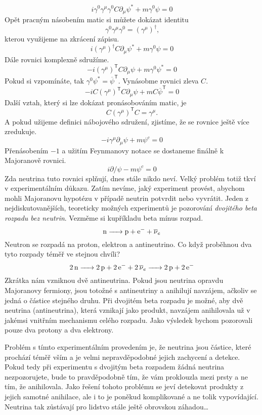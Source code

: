 \documentclass{../../../../style/mkimain}
\begin{document}
\begin{enumerate}
$$i\gamma^0\gamma^\mu\gamma^0C\partial_\mu \psi^*+m\gamma^0\psi=0$$
Opět pracným násobením matic si můžete dokázat identitu
$$\gamma^0\gamma^\mu\gamma^0=\left(\gamma^\mu\right)^\dagger \text{,}$$
kterou využijeme na zkrácení zápisu.
$$i\left(\gamma^\mu\right)^\dagger C\partial_\mu \psi^*+m\gamma^0\psi=0$$
Dále rovnici komplexně sdružíme.
$$-i\left(\gamma^\mu\right)^\mathsf{T} C\partial_\mu \psi+m\gamma^0\psi^*=0$$
Pokud si vzpomínáte, tak $\gamma^0\psi^*=\overline{\psi}^\mathsf{T}$. Vynásobme rovnici zleva $C$.
$$-iC\left(\gamma^\mu\right)^\mathsf{T} C \partial_\mu \psi+mC\overline{\psi}^\mathsf{T}=0$$
Další vztah, který si lze dokázat pronásobováním matic, je
$$C\left(\gamma^\mu\right)^\mathsf{T} C=\gamma^\mu\text{.}$$
A pokud užijeme definici nábojového sdružení, zjistíme, že se rovnice ještě více zredukuje.
$$-i\gamma^\mu\partial_\mu \psi+m\psi^c=0$$
Přenásobením $-1$ a užitím Feynmanovy  notace se dostaneme finálně k Majoranově rovnici.
$$i\partial\!\!\!/\psi-m\psi^c=0$$
Zda neutrina tuto rovnici splňují, dnes stále nikdo neví. Velký problém totiž tkví v experimentálním důkazu. Zatím nevíme, jaký experiment provést, abychom mohli Majoranovu hypotézu v případě neutrin potvrdit nebo vyvrátit. Jeden z nejdiskutovanějších, teoreticky možných experimentů je pozorování \emph{dvojitého beta rozpadu bez neutrin}.
Vezměme si kupříkladu beta mínus rozpad.
   $$\ce{n -> p + e- + \overline{\nu}_e}$$
Neutron se rozpadá na proton, elektron a antineutrino. Co když proběhnou dva tyto rozpady téměř ve stejnou chvíli?$$\ce{2n -> 2p + 2e- + 2\overline{\nu}_e -> 2p + 2e-}$$
Zkrátka nám vzniknou dvě antineutrina. Pokud jsou neutrina opravdu Majoranovy fermiony, jsou totožné s antineutriny a anihilují navzájem, ačkoliv se jedná o částice stejného druhu.
Při dvojitém beta rozpadu je možné, aby dvě neutrina (antineutrina), která vznikají jako produkt, navzájem anihilovala už v jakémsi vnitřním mechanismu celého rozpadu. Jako výsledek bychom pozorovali pouze dva protony a dva elektrony.

Problém s tímto experimentálním provedením je, že neutrina jsou částice, které prochází téměř vším a je velmi nepravděpodobné jejich zachycení a detekce. Pokud tedy při experimentu s dvojitým beta rozpadem žádná neutrina nezpozorujete, bude to pravděpodobně tím, že vám proklouzla mezi prsty a ne tím, že anihilovala. Jako řešení tohoto problému se jeví detekovat produkty z jejich samotné anihilace, ale i to je poněkud komplikované a ne tolik vypovídající. Neutrina tak zůstávají pro lidstvo stále ještě obrovskou záhadou\dots
\end{enumerate}
\end{document}
